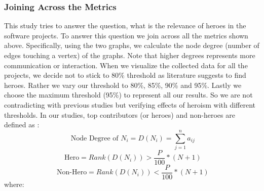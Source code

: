 \documentclass[sigconf,review]{acmart}
\makeatletter
\newenvironment{conditions}
  {\par\vspace{\abovedisplayskip}\noindent\begin{tabular}{>{$}l<{$} @{${}={}$} l}}
  {\end{tabular}\par\vspace{\belowdisplayskip}}
\makeatother
\begin{document}
\subsubsection{Joining Across the Metrics}
\label{sec:Finding Relation}
This study tries to answer the question, what is the relevance of heroes in the software projects. To answer this question we join across all the metrics shown above.
Specifically, using the two graphs,   we calculate the node degree (number of edges touching
a vertex) of the graphs. Note that higher degrees represents more communication or interaction. When we visualize the collected data for all the projects, we decide not to stick to 80\% threshold as literature suggests to find heroes. Rather we vary our threshold to 80\%, 85\%, 90\% and 95\%. Lastly we choose the maximum threshold (95\%) to represent all our results. So we are not contradicting with previous studies but verifying effects of heroism with different thresholds. 
In our studies,
 top contributors (or heroes) and non-heroes
 are defined as : 
\begin{equation}
\label{eq:node-Degree}
    \mbox{ Node Degree of } N_i = D(N_i)= \sum_{j=1}^{n} a_{ij}
\end{equation}
\begin{equation}
\label{eq:hero}
    \mbox{  Hero} = Rank\left(D(N_i)\right) > \frac{P}{100}*(N + 1)
\end{equation}
\begin{equation}
\label{eq:non-hero}
    \mbox{  Non-Hero} = Rank\left(D(N_i)\right) < \frac{P}{100}*(N + 1)
\end{equation}
where:

\end{document}
